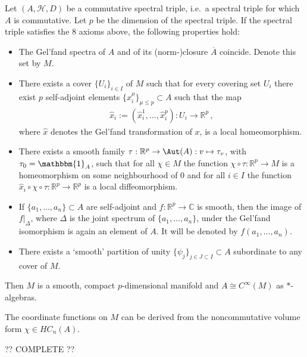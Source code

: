     \begin{construct}
        Let $(A,\mathcal{H},D)$ be a commutative spectral triple, i.e.~a spectral triple for which $A$ is commutative. Let $p$ be the dimension of the spectral triple. If the spectral triple satisfies the 8 axioms above, the following properties hold:
        \begin{itemize}
            \item The Gel'fand spectra of $A$ and of its (norm-)closure $\overline{A}$ coincide. Denote this set by $M$.
            \item There exists a cover $\{U_i\}_{i\in I}$ of $M$ such that for every covering set $U_i$ there exist $p$ self-adjoint elements $\{x^\mu_i\}_{\mu\leq p}\subset A$ such that the map
            \begin{gather}
                \widehat{x}_i:=(\widehat{x}^1_i,\ldots,\widehat{x}^p_i):U_i\rightarrow\mathbb{R}^p\,,
            \end{gather}
            where $\widehat{x}$ denotes the Gel'fand transformation of $x$, is a local homeomorphism.
            \item There exists a smooth family $\tau:\mathbb{R}^p\rightarrow\Aut(A):v\mapsto\tau_v$, with $\tau_0=\mathbbm{1}_A$, such that for all $\chi\in M$ the function $\chi\circ\tau:\mathbb{R}^p\rightarrow M$ is a homeomorphism on some neighbourhood of 0 and for all $i\in I$ the function $\widehat{x}_i\circ\chi\circ\tau:\mathbb{R}^p\rightarrow\mathbb{R}^p$ is a local diffeomorphism.
            \item If $\{a_1,\ldots,a_n\}\subset A$ are self-adjoint and $f:\mathbb{R}^p\rightarrow\mathbb{C}$ is smooth, then the image of $f|_\Delta$, where $\Delta$ is the joint spectrum of $\{a_1,\ldots,a_n\}$, under the Gel'fand isomorphism is again an element of $A$. It will be denoted by $f(a_1,\ldots,a_n)$.
            \item There exists a `smooth' partition of unity $\{\psi_j\}_{j\in J\subset I}\subset A$ subordinate to any cover of $M$.
        \end{itemize}
        Then $M$ is a smooth, compact $p$-dimensional manifold and $A\cong C^\infty(M)$ as $\ast$-algebras.

        The coordinate functions on $M$ can be derived from the noncommutative volume form $\chi\in HC_n(A)$.

        ?? COMPLETE ??
    \end{construct}

